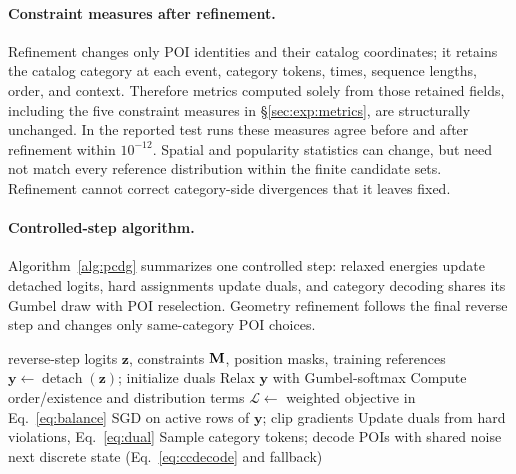 \paragraph{Constraint measures after refinement.} Refinement changes only POI
identities and their catalog coordinates; it retains the catalog category at each event,
category tokens, times, sequence lengths, order, and context. Therefore metrics computed
solely from those retained fields, including the five constraint measures in
\S\ref{sec:exp:metrics}, are structurally unchanged. In the reported test runs these
measures agree before and after refinement within $10^{-12}$. Spatial and popularity
statistics can change, but need not match every reference distribution within the finite
candidate sets. Refinement cannot correct category-side divergences that it leaves fixed.

\paragraph{Controlled-step algorithm.}
\label{sec:method:algorithm}
Algorithm~\ref{alg:pcdg} summarizes one controlled step: relaxed energies
update detached logits, hard assignments update duals, and category decoding
shares its Gumbel draw with POI reselection. Geometry refinement follows the
final reverse step and changes only same-category POI choices.

\begin{algorithm}[t]
\caption{\pcdg: one controlled reverse step}
\label{alg:pcdg}
\begin{algorithmic}[1]
\Require reverse-step logits $\mathbf z$, constraints $\mathbf{M}$, position masks, training references
\State $\mathbf y\gets\operatorname{detach}(\mathbf z)$; initialize duals
    \State Relax $\mathbf y$ with Gumbel-softmax
    \State Compute order/existence and distribution terms
    \State $\mathcal L\gets$ weighted objective in Eq.~\eqref{eq:balance}
    \State SGD on active rows of $\mathbf y$; clip gradients
  \EndFor
  \State Update duals from hard violations, Eq.~\eqref{eq:dual}
\EndFor
\State Sample category tokens; decode POIs with shared noise
\State \Return next discrete state (Eq.~\eqref{eq:ccdecode} and fallback)
\end{algorithmic}
\end{algorithm}
